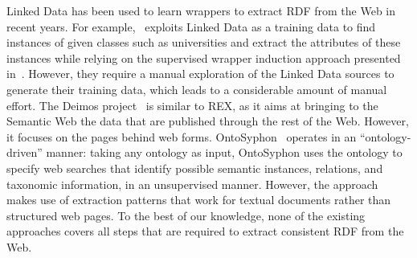 
Linked Data has been used to learn wrappers to extract RDF from the Web in recent years. 
For example,~\cite{Gentile2013} exploits Linked Data as a training data to find instances of given classes such as universities and extract the attributes of these instances while relying on the supervised wrapper induction approach presented in~\cite{Hao2011}. However, they require a manual exploration of the Linked Data sources to generate their training data, which leads to a considerable amount of manual effort.
%
The {\sc Deimos} project~\cite{conf/aaaiss/ParundekarKA10} is similar to REX, as it aims at bringing to the Semantic Web the data that are published through the rest of the Web. 
However, it focuses on the pages behind web forms.
%
%
OntoSyphon~\cite{DBLP:journals/ws/McDowellC08} operates in an ``ontology-driven'' manner: taking any ontology as input, OntoSyphon uses the ontology to specify web searches that identify possible semantic instances, relations, and taxonomic information, in an unsupervised manner. However, the approach makes use of extraction patterns that work for textual documents rather than structured web pages. %
To the best of our knowledge, none of the existing approaches covers all steps that are required to extract consistent RDF from the Web. 
